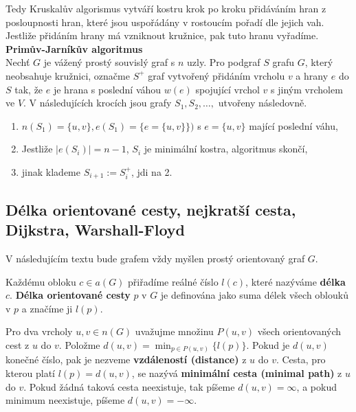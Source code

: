 Tedy Kruskalův algorismus vytváří kostru krok po kroku přidáváním hran z posloupnosti hran, které jsou uspořádány v rostoucím pořadí dle jejich vah. Jestliže přidáním hrany má vzniknout kružnice, pak tuto hranu vyřadíme.
\\

\textbf{Primův-Jarníkův algoritmus}\\
Nechť $G$ je vážený prostý souvislý graf s $n$ uzly. Pro podgraf $S$ grafu $G$, který neobsahuje kružnici, označme $S^+$ graf vytvořený přidáním vrcholu $v$ a hrany $e$ do $S$ tak, že $e$ je hrana s poslední váhou $w(e)$ spojující vrchol $v$ s jiným vrcholem ve $V$. V následujících krocích jsou grafy $S_1, S_2, \ldots, $ utvořeny následovně.
\begin{enumerate}
    \item $n(S_1)=\{u,v\},e(S_1)=\{e=\{u,v\}\})$ s $e=\{u,v\}$ mající poslední váhu,
    \item Jestliže $|e(S_i)|=n-1$, $S_i$ je minimální kostra, algoritmus skončí,
    \item jinak klademe $S_{i+1}:=S^{+}_{i}$, jdi na 2.
\end{enumerate}

\subsection{Délka orientované cesty, nejkratší cesta, Dijkstra, Warshall-Floyd}

V následujícím textu bude grafem vždy myšlen prostý orientovaný graf $G$. 

\begin{definition}
Každému obloku $c \in a(G)$ přiřadíme reálné číslo $l(c)$, které nazýváme \textbf{délka} $c$. \textbf{Délka orientované cesty} $p$ v $G$ je definována jako suma délek všech oblouků v $p$ a značíme ji $l(p)$.
\end{definition}

\begin{definition}
Pro dva vrcholy $u,v \in n(G)$ uvažujme množinu $P(u,v)$ všech orientovaných  cest z $u$ do $v$. Položme $d(u,v) = \min_{p \in P(u,v)} \{ l(p)\}$. Pokud je $d(u,v)$ konečné číslo, pak je nezveme \textbf{vzdáleností (distance)} z $u$ do $v$. Cesta, pro kterou platí $l(p) = d(u,v)$, se nazývá \textbf{minimální cesta (minimal path)} z $u$ do $v$. Pokud žádná taková cesta neexistuje, tak píšeme $d(u,v) = \infty$, a pokud minimum neexistuje, píšeme $d(u,v) = -\infty$.
\end{definition}

